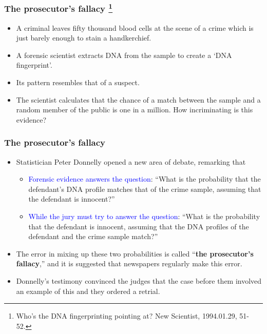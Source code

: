 \documentclass[handout]{beamer}\usepackage[]{graphicx}\usepackage[]{color}
\newcommand{\blue}[1]{\textcolor{blue}{#1}}
\begin{document}
\begin{frame}
\frametitle{The prosecutor's fallacy \footnote{{\tiny Who's the DNA fingerprinting pointing at? New Scientist, 1994.01.29, 51-52.}}}

 \begin{itemize}
 	\setlength\itemsep{1em}
 	\item A criminal leaves fifty thousand blood cells at the scene of a crime which is just barely enough to stain a handkerchief. 
 	\item A forensic scientist extracts DNA from the sample to create a ‘DNA fingerprint’. 
 	\item Its pattern resembles that of a suspect. 
 	\item The scientist calculates that the chance of a match between the sample and a random member of the public is one in a million. How incriminating is this evidence?
 \end{itemize}

\end{frame}

\begin{frame}
\frametitle{The prosecutor's fallacy}

	
	\begin{itemize}
		\item Statistician Peter Donnelly opened a new area of debate, remarking that 

\begin{itemize}
	 	\setlength\itemsep{1em}
	\item \blue{Forensic evidence answers the question}: ``What is the probability that the defendant's DNA profile matches that of the crime sample, assuming that the defendant is innocent?''
			
	\item \blue{While the jury must try to answer the question}: ``What is the probability that the defendant is 		innocent, assuming that the DNA profiles of the defendant and the crime sample match?'' 
\end{itemize}
\pause 
		\item
		The error in mixing up these two probabilities 
		is called ``\textbf{the prosecutor's fallacy},'' 
		and it is suggested that newspapers regularly 
		make this error. 
		\item
		Donnelly's testimony convinced the judges 
		that the case before them involved an example of this and they 
		ordered a retrial.
	\end{itemize}

\end{frame}
\end{document}
